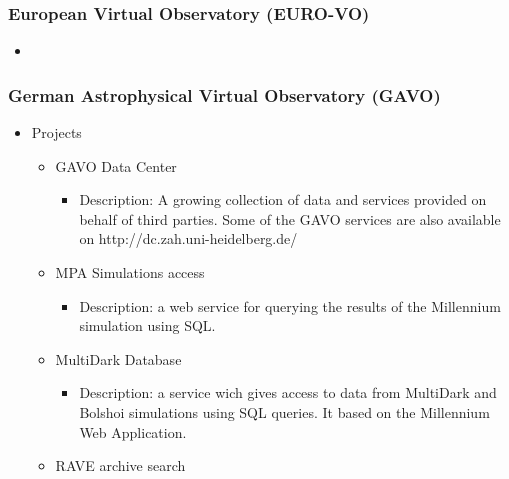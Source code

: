 \documentclass[11pt]{article}
\begin{document}
              \subsubsection{European Virtual Observatory (EURO-VO)}
                  \begin{itemize}
                      \item
                  \end{itemize}

              \subsubsection{German Astrophysical Virtual Observatory (GAVO)}
                  \begin{itemize}
                      \item Projects
                          \begin{itemize}
                              \item GAVO Data Center
                                  \begin{itemize}
                                      \item Description: A growing collection of
data and services provided on behalf of third parties. Some of the GAVO services
are also available on http://dc.zah.uni-heidelberg.de/
                                  \end{itemize}
                              \item MPA Simulations access
                                  \begin{itemize}
                                      \item Description: a web service for
querying the results of the Millennium simulation using SQL.
                                  \end{itemize}
                              \item MultiDark Database
                                  \begin{itemize}
                                      \item Description: a service wich gives
access to data from MultiDark and Bolshoi simulations using SQL queries. It
based on the Millennium Web Application.
                                  \end{itemize}
                              \item RAVE archive search
                                  \begin{itemize}

\end{itemize}
\end{itemize}
\end{itemize}
\end{document}
